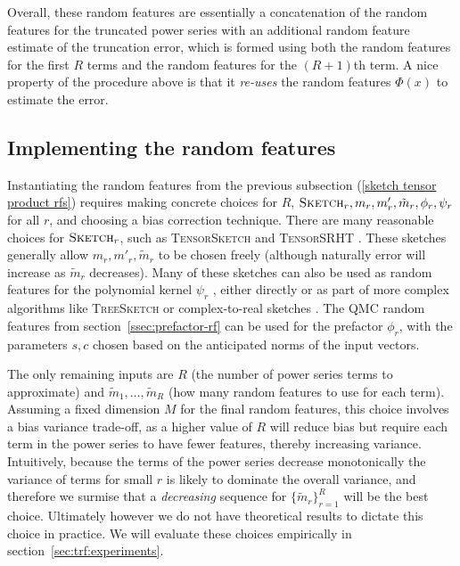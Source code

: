 Overall, these random features are essentially a concatenation of
the random features for the truncated power series
with an additional random feature estimate of the truncation error,
which is formed using both the random features for the first $R$ terms
and the random features for the $(R+1)$th term.
A nice property of the procedure above is that it \emph{re-uses}
the random features $\Phi(x)$ to estimate the error.


\subsection{Implementing the random features}\label{ssec:implementing tdp rf}

Instantiating the random features from the previous subsection (\ref{sketch tensor product rfs})
requires making concrete choices for $R$, $\textsc{Sketch}_r,m_r,m'_r,\tilde{m}_r,\phi_r,\psi_r$ for all $r$,
and choosing a bias correction technique.
There are many reasonable choices for $\textsc{Sketch}_r$, such as
\textsc{TensorSketch} \citep{pham2013fast}
and \textsc{TensorSRHT} \citep{ahle2020oblivious}.
These sketches generally allow $m_r,m'_r,\tilde{m}_r$ to be chosen freely
(although naturally error will increase as $\tilde{m}_r$ decreases).
Many of these sketches can also be used as random features for the polynomial kernel $\psi_r$ \citep{wacker2022improved},
either directly or as part of more complex algorithms like  \textsc{TreeSketch} \citep{ahle2020oblivious}
or complex-to-real sketches \citep{wacker2023complextoreal}.
The QMC random features from section~\ref{ssec:prefactor-rf} can be used for the prefactor $\phi_r$,
with the parameters $s,c$ chosen based on the anticipated norms of the input vectors.

The only remaining inputs are $R$ (the number of power series terms to approximate)
and $\tilde{m}_1,\ldots,\tilde{m}_R$ (how many random features to use for each term).
Assuming a fixed dimension $M$ for the final random features,
this choice involves a bias variance trade-off,
as a higher value of $R$ will reduce bias but require each term in the power series
to have fewer features, thereby increasing variance.
Intuitively, because the terms of the power series decrease monotonically
the variance of terms for small $r$ is likely to dominate the overall variance,
and therefore we surmise that a \emph{decreasing} sequence for $\{\tilde{m}_r\}_{r=1}^R$
will be the best choice.
Ultimately however we do not have theoretical results to dictate this choice in practice.
We will evaluate these choices empirically in section~\ref{sec:trf:experiments}.











